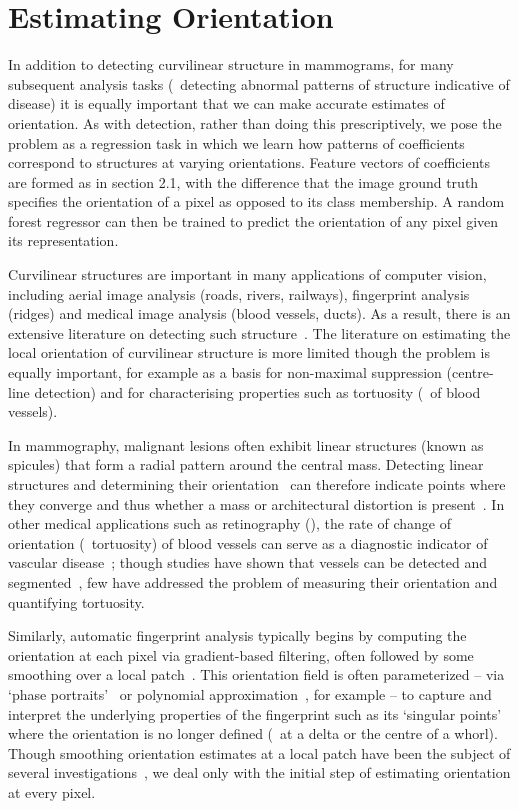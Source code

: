 \section{Estimating Orientation}
In addition to detecting curvilinear structure in mammograms, for many subsequent analysis tasks (\eg~detecting abnormal patterns of structure indicative of disease) it is equally important that we can make accurate estimates of orientation. As with detection, rather than doing this prescriptively, we pose the problem as a regression task in which we learn how patterns of \dtcwt coefficients correspond to structures at varying orientations. Feature vectors of \dtcwt coefficients are formed as in section 2.1, with the difference that the image ground truth specifies the orientation of a pixel as opposed to its class membership. A random forest regressor can then be trained to predict the orientation of any pixel given its \dtcwt representation.

Curvilinear structures are important in many applications of computer vision, including aerial image analysis (roads, rivers, railways), fingerprint analysis (ridges) and medical image analysis (blood vessels, ducts). As a result, there is an extensive literature on detecting such structure~\cite{Papari_Petkov_IVC11}. The literature on estimating the local orientation of curvilinear structure is more limited though the problem is equally important, for example as a basis for non-maximal suppression (centre-line detection) and for characterising properties such as tortuosity (\eg~of blood vessels).

In mammography, malignant lesions often exhibit linear structures (known as spicules) that form a radial pattern around the central mass. Detecting linear structures and determining their orientation~\cite{Zwiggelaar_etal_MIA99,Zwiggelaar_etal_TMI04} can therefore indicate points where they converge and thus whether a mass or architectural distortion is present~\cite{Karssemeijer_teBrake_TMI96,Rangayyan_Ayres_MBEC06}. In other medical applications such as retinography (), the rate of change of orientation (\ie~tortuosity) of blood vessels can serve as a diagnostic indicator of vascular disease~\cite{Hart_etal_IJMI99}; though studies have shown that vessels can be detected and segmented~\cite{Staal_etal_TMI04,Ricci_Perfetti_TMI07,Dabbah_etal_MICCAI10}, few have addressed the problem of measuring their orientation and quantifying tortuosity.

Similarly, automatic fingerprint analysis typically begins by computing the orientation at each pixel via gradient-based filtering, often followed by some smoothing over a local patch~\cite{Bazen_Gerez_TPAMI02,Mei_etal_IVC09}. This orientation field is often parameterized -- via `phase portraits'~\cite{Li_etal_PR06} or polynomial approximation~\cite{Gu_etal_PR04}, for example -- to capture and interpret the underlying properties of the fingerprint such as its `singular points' where the orientation is no longer defined (\eg~at a delta or the centre of a whorl). Though smoothing orientation estimates at a local patch have been the subject of several investigations~\cite{Kass_Witkin_CVGIP87,Rao_Jain_TPAMI92,Perona_TIP98}, we deal only with the initial step of estimating orientation at every pixel.

